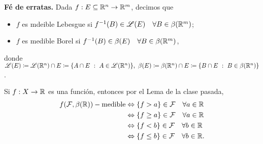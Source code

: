 
\textbf{Fé de erratas.} Dada $f : E \subseteq \mathbb{R}^n \to \mathbb{R}^m$, decimos que
\begin{itemize}
	\item $f$ es mdeible Lebesgue si $f^{-1}(B) \in \mathscr{L}(E) \quad \forall B \in \beta(\mathbb{R}^m)$;

	\item $f$ es medible Borel si $f^{-1}(B) \in \beta(E) \quad \forall B \in \beta(\mathbb{R}^m)$,
\end{itemize}
donde $\mathscr{L}(E) \coloneq \mathscr{L}(\mathbb{R}^n) \cap E \coloneq \{A \cap E \ : \ A \in \mathscr{L}(\mathbb{R}^n) \},\ \beta(E) \coloneq \beta(\mathbb{R}^n) \cap E \coloneq \{ B \cap E \ : \ B \in \beta(\mathbb{R}^n) \}$.

\begin{remark}
	Si $f : X \to \mathbb{R}$ es una función, entonces por el Lema de la clase pasada,
	\begin{align*}
		f( \mathcal{F}, \beta(\mathbb{R}) ) - \text{medible} & \Leftrightarrow \{f>a\} \in \mathcal{F} \quad \forall a \in \mathbb{R} \\
		&\Leftrightarrow \{f \geq a\} \in \mathcal{F} \quad \forall  a \in \mathbb{R}   \\
		&\Leftrightarrow \{f<b\}   \in \mathcal{F} \quad \forall b \in \mathbb{R} \\
		&\Leftrightarrow \{f \leq b\}  \in \mathcal{F} \quad \forall b \in \mathbb{R}
	.\end{align*}
\end{remark}

